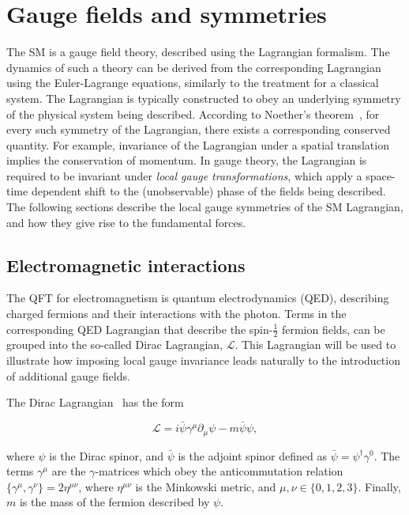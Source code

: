 \section{Gauge fields and symmetries}

The SM is a gauge field theory, described using the Lagrangian formalism. The dynamics of such a theory can be derived from the corresponding Lagrangian using the Euler-Lagrange equations, similarly to the treatment for a classical system. The Lagrangian is typically constructed to obey an underlying symmetry of the physical system being described. According to Noether's theorem~\cite{Nother}, for every such symmetry of the Lagrangian, there exists a corresponding conserved quantity. For example, invariance of the Lagrangian under a spatial translation implies the conservation of momentum. In gauge theory, the Lagrangian is required to be invariant under \textit{local gauge transformations}, which apply a space-time dependent shift to the (unobservable) phase of the fields being described. The following sections describe the local gauge symmetries of the SM Lagrangian, and how they give rise to the fundamental forces.

\subsection{Electromagnetic interactions}

The QFT for electromagnetism is quantum electrodynamics (QED), describing charged fermions and their interactions with the photon. Terms in the corresponding QED Lagrangian that describe the spin-$\frac{1}{2}$ fermion fields, can be grouped into the so-called Dirac Lagrangian, $\mathcal{L}$. This Lagrangian will be used to illustrate how imposing local gauge invariance leads naturally to the introduction of additional gauge fields. 

The Dirac Lagrangian~\cite{Thomson} has the form

\begin{equation}
    \mathcal{L} = i\bar{\psi}\gamma^{\mu}\partial_{\mu}\psi - m\bar{\psi}\psi,
\end{equation}

\noindent where $\psi$ is the Dirac spinor, and $\bar{\psi}$ is the adjoint spinor defined as $\bar{\psi}=\psi^{\dagger}\gamma^{0}$. The terms $\gamma^{\mu}$ are the $\gamma$-matrices which obey the anticommutation relation $\{\gamma^{\mu},\gamma^{\nu}\} = 2\eta^{\mu\nu}$, where $\eta^{\mu\nu}$ is the Minkowski metric, and $\mu,\nu \in \{0,1,2,3\}$. Finally, $m$ is the mass of the fermion described by $\psi$.

